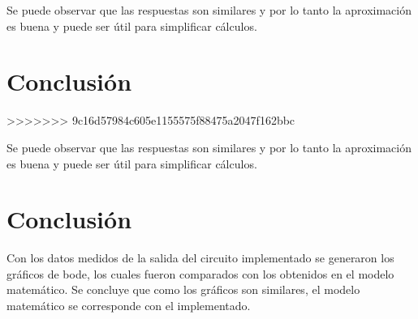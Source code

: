 \documentclass[10pt,a4paper]{article} %
\begin{document}
Se puede observar que las respuestas son similares y por lo tanto la aproximación es buena y puede ser útil para simplificar cálculos.
 
\section{Conclusión}

>>>>>>> 9c16d57984c605e1155575f88475a2047f162bbc

Se puede observar que las respuestas son similares y por lo tanto la aproximación es buena y puede ser útil para simplificar cálculos.
 
\section{Conclusión}
Con los datos medidos de la salida del circuito implementado se generaron los gráficos de bode, los cuales fueron comparados con los obtenidos en el modelo matemático. Se concluye que como los gráficos son similares, el modelo matemático se corresponde con el implementado.
\end{document}
